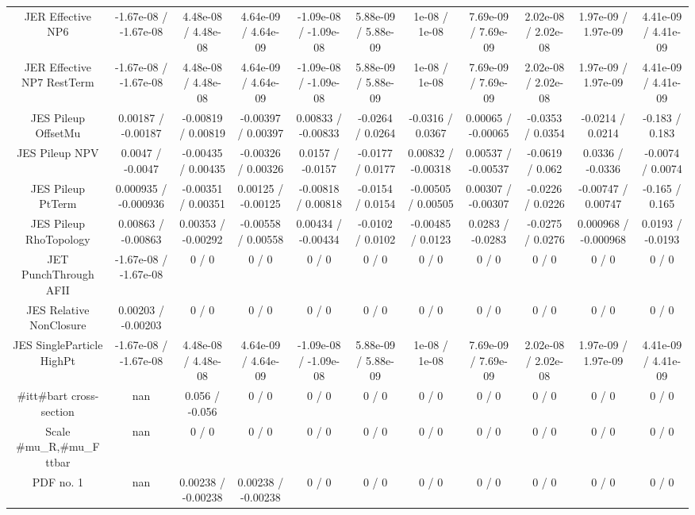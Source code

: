 \begin{table}[htbp]
\begin{center}
\begin{tabular}{|c|c|c|c|c|c|c|c|c|c|c|}
  JER Effective NP6 & -1.67e-08 / -1.67e-08 & 4.48e-08 / 4.48e-08 & 4.64e-09 / 4.64e-09 & -1.09e-08 / -1.09e-08 & 5.88e-09 / 5.88e-09 & 1e-08 / 1e-08 & 7.69e-09 / 7.69e-09 & 2.02e-08 / 2.02e-08 & 1.97e-09 / 1.97e-09 & 4.41e-09 / 4.41e-09 \\ 
  JER Effective NP7 RestTerm & -1.67e-08 / -1.67e-08 & 4.48e-08 / 4.48e-08 & 4.64e-09 / 4.64e-09 & -1.09e-08 / -1.09e-08 & 5.88e-09 / 5.88e-09 & 1e-08 / 1e-08 & 7.69e-09 / 7.69e-09 & 2.02e-08 / 2.02e-08 & 1.97e-09 / 1.97e-09 & 4.41e-09 / 4.41e-09 \\ 
  JES Pileup OffsetMu & 0.00187 / -0.00187 & -0.00819 / 0.00819 & -0.00397 / 0.00397 & 0.00833 / -0.00833 & -0.0264 / 0.0264 & -0.0316 / 0.0367 & 0.00065 / -0.00065 & -0.0353 / 0.0354 & -0.0214 / 0.0214 & -0.183 / 0.183 \\ 
  JES Pileup NPV & 0.0047 / -0.0047 & -0.00435 / 0.00435 & -0.00326 / 0.00326 & 0.0157 / -0.0157 & -0.0177 / 0.0177 & 0.00832 / -0.00318 & 0.00537 / -0.00537 & -0.0619 / 0.062 & 0.0336 / -0.0336 & -0.0074 / 0.0074 \\ 
  JES Pileup PtTerm & 0.000935 / -0.000936 & -0.00351 / 0.00351 & 0.00125 / -0.00125 & -0.00818 / 0.00818 & -0.0154 / 0.0154 & -0.00505 / 0.00505 & 0.00307 / -0.00307 & -0.0226 / 0.0226 & -0.00747 / 0.00747 & -0.165 / 0.165 \\ 
  JES Pileup RhoTopology & 0.00863 / -0.00863 & 0.00353 / -0.00292 & -0.00558 / 0.00558 & 0.00434 / -0.00434 & -0.0102 / 0.0102 & -0.00485 / 0.0123 & 0.0283 / -0.0283 & -0.0275 / 0.0276 & 0.000968 / -0.000968 & 0.0193 / -0.0193 \\ 
  JET PunchThrough AFII & -1.67e-08 / -1.67e-08 & 0 / 0 & 0 / 0 & 0 / 0 & 0 / 0 & 0 / 0 & 0 / 0 & 0 / 0 & 0 / 0 & 0 / 0 \\ 
  JES Relative NonClosure & 0.00203 / -0.00203 & 0 / 0 & 0 / 0 & 0 / 0 & 0 / 0 & 0 / 0 & 0 / 0 & 0 / 0 & 0 / 0 & 0 / 0 \\ 
  JES SingleParticle HighPt & -1.67e-08 / -1.67e-08 & 4.48e-08 / 4.48e-08 & 4.64e-09 / 4.64e-09 & -1.09e-08 / -1.09e-08 & 5.88e-09 / 5.88e-09 & 1e-08 / 1e-08 & 7.69e-09 / 7.69e-09 & 2.02e-08 / 2.02e-08 & 1.97e-09 / 1.97e-09 & 4.41e-09 / 4.41e-09 \\ 
  #it{t#bar{t}} cross-section &    nan    & 0.056 / -0.056 & 0 / 0 & 0 / 0 & 0 / 0 & 0 / 0 & 0 / 0 & 0 / 0 & 0 / 0 & 0 / 0 \\ 
  Scale #mu_{R},#mu_{F} ttbar &    nan    & 0 / 0 & 0 / 0 & 0 / 0 & 0 / 0 & 0 / 0 & 0 / 0 & 0 / 0 & 0 / 0 & 0 / 0 \\ 
  PDF no. 1 &    nan    & 0.00238 / -0.00238 & 0.00238 / -0.00238 & 0 / 0 & 0 / 0 & 0 / 0 & 0 / 0 & 0 / 0 & 0 / 0 & 0 / 0 \\ 

\end{tabular}
\end{center}
\end{table}
